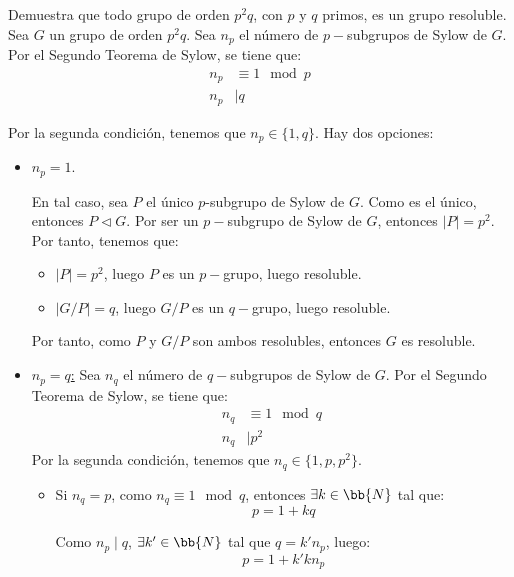\begin{ejercicio}
    Demuestra que todo grupo de orden $p^2q$, con $p$ y $q$ primos, es un grupo resoluble.\\


    Sea $G$ un grupo de orden $p^2q$. Sea $n_p$ el número de $p-$subgrupos de Sylow de $G$. Por el Segundo Teorema de Sylow, se tiene que:
    \begin{align*}
        n_p &\equiv 1 \mod p \\
        n_p &\mid q
    \end{align*}

    Por la segunda condición, tenemos que $n_p\in \{1,q\}$.
    Hay dos opciones:
    \begin{itemize}
        \item \ul{$n_p=1$}.
        
        En tal caso, sea $P$ el único $p$-subgrupo de Sylow de $G$. Como es el único, entonces $P\lhd G$. Por ser un $p-$subgrupo de Sylow de $G$, entonces $|P|=p^2$. Por tanto, tenemos que:
        \begin{itemize}
            \item $|P|=p^2$, luego $P$ es un $p-$grupo, luego resoluble.
            \item $|G/P|=q$, luego $G/P$ es un $q-$grupo, luego resoluble.
        \end{itemize}
        Por tanto, como $P$ y $G/P$ son ambos resolubles, entonces $G$ es resoluble.
        
        \item \ul{$n_p=q$:} Sea $n_q$ el número de $q-$subgrupos de Sylow de $G$. Por el Segundo Teorema de Sylow, se tiene que:
        \begin{align*}
            n_q &\equiv 1 \mod q \\
            n_q &\mid p^2
        \end{align*}
        Por la segunda condición, tenemos que $n_q\in \{1,p,p^2\}$.
        \begin{itemize}
            \item Si $n_q=p$, como $n_q\equiv 1 \mod q$, entonces $\exists k\in\bb{N}$ tal que:
            \begin{equation*}
                p = 1+ kq
            \end{equation*}

            Como $n_p\mid q$, $\exists k'\in\bb{N}$ tal que $q=k'n_p$, luego:
            \begin{equation*}
                p = 1 + k'kn_p
            \end{equation*}


\end{itemize}
\end{itemize}
\end{ejercicio}
